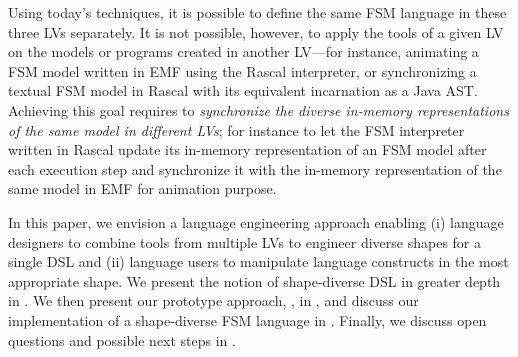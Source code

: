 Using today's techniques, it is possible to define the same FSM language in these three LVs separately.
It is not possible, however, to apply the tools of a given LV on the models or programs created in another LV---for instance, animating a FSM model written in EMF using the Rascal interpreter, or synchronizing a textual FSM model in Rascal with its equivalent incarnation as a Java AST.
Achieving this goal requires to \emph{synchronize the diverse in-memory representations of the same model in different LVs}; for instance to let the FSM interpreter written in Rascal update its in-memory representation of an FSM model after each execution step and synchronize it with the in-memory representation of the same model in EMF for animation purpose.

In this paper, we envision a language engineering approach enabling (i) language designers to combine tools from multiple LVs to engineer diverse shapes for a single DSL and (ii) language users to manipulate language constructs in the most appropriate shape.
We present the notion of shape-diverse DSL in greater depth in .
We then present our prototype approach, \prism, in , and discuss our implementation of a shape-diverse FSM language in .
Finally, we discuss open questions and possible next steps in .
